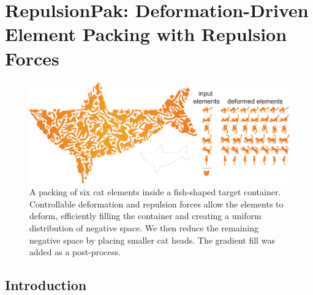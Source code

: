 
\newcommand{\simforce}[1]{\bm{F}_{\kern -0.02in #1}}

\chapter[RepulsionPak: Deformation-Driven Element Packing \newline with Repulsion Forces]
{RepulsionPak: Deformation-Driven Element Packing with Repulsion Forces}
\label{chapter_repulsionpak}


\begin{figure}[h!]
  \centering
  \includegraphics[width=1.0\textwidth]{figures/repulsionpak/cat_whale_04}
  \caption[A packing of a cat]
  {
  \label{cat_packing}
           A packing of six cat elements inside a fish-shaped target container. 
           Controllable deformation and repulsion forces allow the elements to deform,
           efficiently filling the container and creating a uniform distribution of
           negative space. We then reduce the remaining negative space by placing smaller
           cat heads. The gradient fill was added as a post-process.}
\end{figure}



\section{Introduction}
\label{repulsionpak_introduction}


